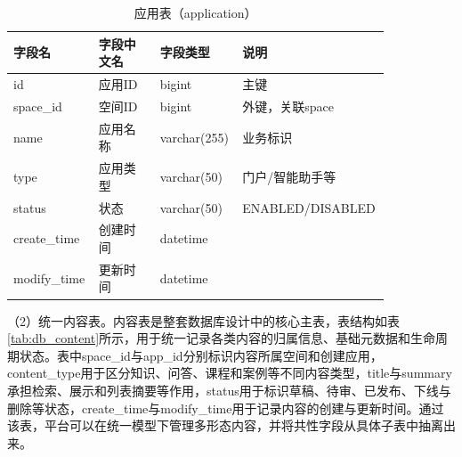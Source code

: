 \begin{table}[!htbp]
  \centering
  \caption{应用表（application）}
  \label{tab:db_application}
  \small
  \begin{tabular}{>{\raggedright\arraybackslash}p{0.20\linewidth}|>{\raggedright\arraybackslash}p{0.16\linewidth}|>{\raggedright\arraybackslash}p{0.16\linewidth}|>{\raggedright\arraybackslash}p{0.32\linewidth}}
    \hline
    字段名 & 字段中文名 & 字段类型 & 说明 \\ \hline
    id & 应用ID & bigint & 主键 \\ \hline
    space\_id & 空间ID & bigint & 外键，关联space \\ \hline
    name & 应用名称 & varchar(255) & 业务标识 \\ \hline
    type & 应用类型 & varchar(50) & 门户/智能助手等 \\ \hline
    status & 状态 & varchar(50) & ENABLED/DISABLED \\ \hline
    create\_time & 创建时间 & datetime & \\ \hline
    modify\_time & 更新时间 & datetime & \\ \hline
  \end{tabular}
\end{table}

\FloatBarrier

（2）统一内容表。内容表是整套数据库设计中的核心主表，表结构如表\ref{tab:db_content}所示，用于统一记录各类内容的归属信息、基础元数据和生命周期状态。表中space\_\allowbreak id与app\_\allowbreak id分别标识内容所属空间和创建应用，content\_\allowbreak type用于区分知识、问答、课程和案例等不同内容类型，title与summary承担检索、展示和列表摘要等作用，status用于标识草稿、待审、已发布、下线与删除等状态，create\_\allowbreak time与modify\_\allowbreak time用于记录内容的创建与更新时间。通过该表，平台可以在统一模型下管理多形态内容，并将共性字段从具体子表中抽离出来。

